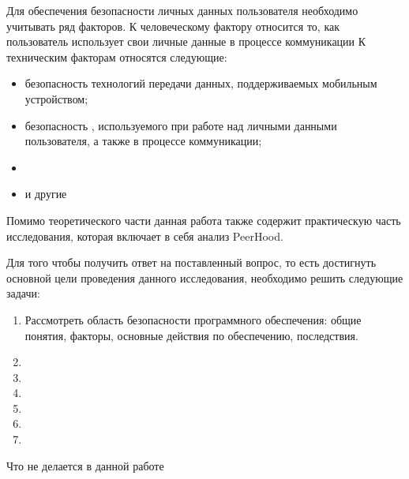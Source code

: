 \Sentence
Для обеспечения безопасности личных данных пользователя необходимо учитывать ряд факторов.
\Sentence
К человеческому фактору относится то, как пользователь использует свои личные данные в процессе
коммуникации
\Sentence
К техническим факторам относятся следующие:
\begin{itemize}
	\item безопасность технологий передачи данных, поддерживаемых мобильным устройством;
	\item безопасность , используемого при работе над личными данными 
		пользователя, а также в процессе коммуникации;
	\item 
	\item и другие
\end{itemize}

\Sentence

\Sentence
Помимо теоретического части данная работа также содержит практическую часть исследования, которая 
включает в себя анализ  PeerHood.

\Sentence
Для того чтобы получить ответ на поставленный вопрос, то есть достигнуть основной цели проведения 
данного исследования, необходимо решить следующие задачи:
\begin{enumerate}
	\item Рассмотреть область безопасности программного обеспечения: общие понятия, факторы, 
		основные действия по обеспечению, последствия.
	\item {}
	\item {}
	\item {}
	\item {}
	\item {}
	\item {}
\end{enumerate}

\Sentence
Что не делается в данной работе
